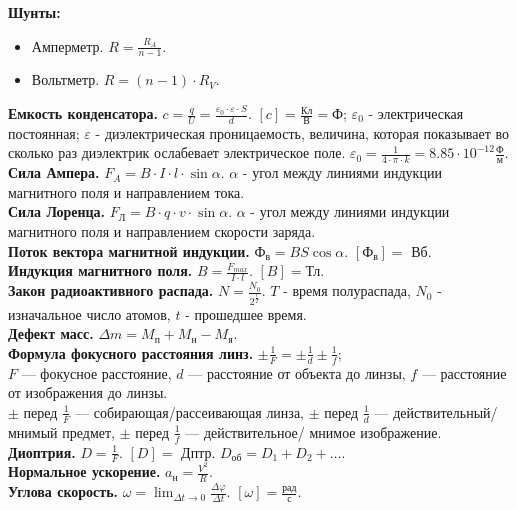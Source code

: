 \documentclass{article}
\begin{document}
	\textbf{Шунты:}
	\begin{itemize}
		\item Амперметр. $R = \frac{R_{A}}{n - 1}$.
		\item Вольтметр. $R = (n - 1) \cdot R_{V}$.
	\end{itemize}
	\textbf{Емкость конденсатора.} $c = \frac{q}{U} = \frac{\varepsilon_{0} \cdot \varepsilon \cdot S}{d}$. $[c] = \frac{\text{Кл}}{\text{В}} = \text{Ф}$; $\varepsilon_{0}$ - электрическая постоянная; $\varepsilon$ - диэлектрическая проницаемость, величина, которая показывает во сколько раз диэлектрик ослабевает электрическое поле. $\varepsilon_{0} = \frac{1}{4 \cdot \pi \cdot k} = 8.85 \cdot 10^{-12} \frac{\text{Ф}}{\text{м}}$. \\
	\textbf{Сила Ампера.} $F_{A} = B \cdot I \cdot l \cdot \sin\alpha$. $\alpha$ - угол между линиями индукции магнитного поля и направлением тока. \\
	\textbf{Сила Лоренца.} $F_{\text{Л}} = B \cdot q \cdot v \cdot \sin\alpha$. $\alpha$ - угол между линиями индукции магнитного поля и направлением скорости заряда. \\
	\textbf{Поток вектора магнитной индукции.} $\text{Ф}_{\text{в}} = BS \cos\alpha$. $[\text{Ф}_{\text{в}}] =$ Вб. \\
	\textbf{Индукция магнитного поля.} $B = \frac{F_{max}}{I \cdot l}$. $[B] = \text{Тл}$. \\
	\textbf{Закон радиоактивного распада.} $N = \frac{N_{0}}{2^{\frac{t}{T}}}$. $T$ - время полураспада, $N_{0}$ - изначальное число атомов, $t$ - прошедшее время. \\
	\textbf{Дефект масс.} $\varDelta m = M_{\text{п}} + M_{\text{н}} - M_{\text{я}}$. \\
	\textbf{Формула фокусного расстояния линз.} $\pm \frac{1}{F} = \pm \frac{1}{d} \pm \frac{1}{f}$; \\
	$F$ --- фокусное расстояние, $d$ --- расстояние от объекта до линзы, $f$ --- расстояние от изображения до линзы. \\
	$\pm$ перед $\frac{1}{F}$ --- собирающая/рассеивающая линза, $\pm$ перед $\frac{1}{d}$ --- действительный/мнимый предмет, $\pm$ перед $\frac{1}{f}$ --- действительное/ мнимое изображение. \\
	\textbf{Диоптрия.} $D = \frac{1}{F}$. $[D] =$ Дптр. $D_{\text{об}} = D_1 + D_2 + \dots$. \\
	\textbf{Нормальное ускорение.} $a_{\text{н}} = \frac{V^2}{R}$. \\
	\textbf{Углова скорость.} $\omega = \lim_{\varDelta t \rightarrow 0} \frac{\varDelta \varphi}{\varDelta t}$. $[\omega] = \frac{\text{рад}}{\text{с}}$. \\
\end{document}
